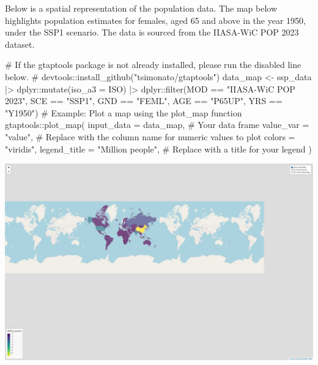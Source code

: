 \documentclass[
  letterpaper,
  DIV=11,
  numbers=noendperiod]{scrartcl}
\newenvironment{Shaded}{}{}
\newcommand{\AttributeTok}[1]{\textcolor[rgb]{0.00,0.34,0.68}{#1}}
\newcommand{\CommentTok}[1]{\textcolor[rgb]{0.54,0.53,0.53}{#1}}
\newcommand{\FunctionTok}[1]{\textcolor[rgb]{0.39,0.29,0.61}{#1}}
\newcommand{\NormalTok}[1]{\textcolor[rgb]{0.12,0.11,0.11}{#1}}
\newcommand{\OtherTok}[1]{\textcolor[rgb]{0.00,0.43,0.16}{#1}}
\newcommand{\SpecialCharTok}[1]{\textcolor[rgb]{0.24,0.68,0.91}{#1}}
\newcommand{\StringTok}[1]{\textcolor[rgb]{0.75,0.01,0.01}{#1}}
\begin{document}
Below is a spatial representation of the population data. The map below
highlights population estimates for females, aged 65 and above in the
year 1950, under the SSP1 scenario. The data is sourced from the
IIASA-WiC POP 2023 dataset.

\begin{Shaded}
\begin{Highlighting}[]
\CommentTok{\# If the gtaptools package is not already installed, please run the disabled line below.}
\CommentTok{\# devtools::install\_github("tsimonato/gtaptools")}
\NormalTok{data\_map  }\OtherTok{\textless{}{-}}\NormalTok{ ssp\_data }\SpecialCharTok{|\textgreater{}} 
\NormalTok{  dplyr}\SpecialCharTok{::}\FunctionTok{mutate}\NormalTok{(}\AttributeTok{iso\_a3 =}\NormalTok{ ISO) }\SpecialCharTok{|\textgreater{}} 
\NormalTok{  dplyr}\SpecialCharTok{::}\FunctionTok{filter}\NormalTok{(MOD }\SpecialCharTok{==} \StringTok{"IIASA{-}WiC POP 2023"}\NormalTok{,}
\NormalTok{                SCE }\SpecialCharTok{==} \StringTok{"SSP1"}\NormalTok{,}
\NormalTok{                GND }\SpecialCharTok{==} \StringTok{"FEML"}\NormalTok{,}
\NormalTok{                AGE }\SpecialCharTok{==} \StringTok{"P65UP"}\NormalTok{,}
\NormalTok{                YRS }\SpecialCharTok{==} \StringTok{"Y1950"}\NormalTok{)}
\CommentTok{\# Example: Plot a map using the \textasciigrave{}plot\_map\textasciigrave{} function}
\NormalTok{gtaptools}\SpecialCharTok{::}\FunctionTok{plot\_map}\NormalTok{(}
  \AttributeTok{input\_data =}\NormalTok{ data\_map,       }\CommentTok{\# Your data frame}
  \AttributeTok{value\_var =} \StringTok{"value"}\NormalTok{,    }\CommentTok{\# Replace with the column name for numeric values to plot}
  \AttributeTok{colors =} \StringTok{"viridis"}\NormalTok{,}
  \AttributeTok{legend\_title =} \StringTok{"Million people"}\NormalTok{,        }\CommentTok{\# Replace with a title for your legend}
\NormalTok{)}
\end{Highlighting}
\end{Shaded}

\includegraphics{index_files/figure-pdf/unnamed-chunk-6-1.pdf}
\end{document}
